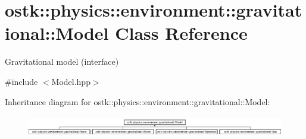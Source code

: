 \hypertarget{classostk_1_1physics_1_1environment_1_1gravitational_1_1_model}{}\section{ostk\+:\+:physics\+:\+:environment\+:\+:gravitational\+:\+:Model Class Reference}
\label{classostk_1_1physics_1_1environment_1_1gravitational_1_1_model}


Gravitational model (interface)  




{\ttfamily \#include $<$Model.\+hpp$>$}

Inheritance diagram for ostk\+:\+:physics\+:\+:environment\+:\+:gravitational\+:\+:Model\+:\begin{figure}[H]
\begin{center}
\leavevmode
\includegraphics[height=0.930233cm]{classostk_1_1physics_1_1environment_1_1gravitational_1_1_model}
\end{center}
\end{figure}

